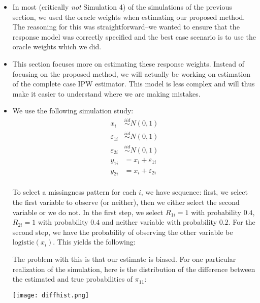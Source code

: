 \documentclass[12pt]{article}
\newcommand{\logistic}{{\text{logistic}}}
\begin{document}
\begin{itemize}
  \item In most (critically \textit{not} Simulation 4) of the simulations of the
    previous section, we used the oracle weights when estimating our proposed
    method. The reasoning for this was straightforward{--}we wanted to ensure
    that the response model was correctly specified and the best case scenario
    is to use the oracle weights which we did.
    
  \item This section focuses more on estimating these response weights. Instead
    of focusing on the proposed method, we will actually be working on
    estimation of the complete case IPW estimator. This model is less complex
    and will thus make it easier to understand where we are making mistakes.

  \item We use the following simulation study:
    \begin{align*}
      x_i &\stackrel{iid}{\sim} N(0, 1)\\
      \varepsilon_{1i} &\stackrel{iid}{\sim} N(0, 1)\\
      \varepsilon_{2i} &\stackrel{iid}{\sim} N(0, 1)\\
      y_{1i} &= x_i + \varepsilon_{1i} \\
      y_{2i} &= x_i + \varepsilon_{2i} \\
    \end{align*}

    To select a missingness pattern for each $i$, we have sequence: first, we
    select the first variable to observe (or neither), then we either select the
    second variable or we do not. In the first step, we select $R_{1i} = 1$ with
    probability $0.4$, $R_{2i} = 1$ with probability $0.4$ and neither variable
    with probability $0.2$. For the second step, we have the probability of
    observing the other variable be $\logistic(x_i)$. This yields the following:

    

    The problem with this is that our estimate is biased. For one particular
    realization of the simulation, here is the distribution of the difference
    between the estimated and true probabilities of $\pi_{11}$:

    \texttt{[image: diffhist.png]}
  
\end{itemize}
\end{document}

